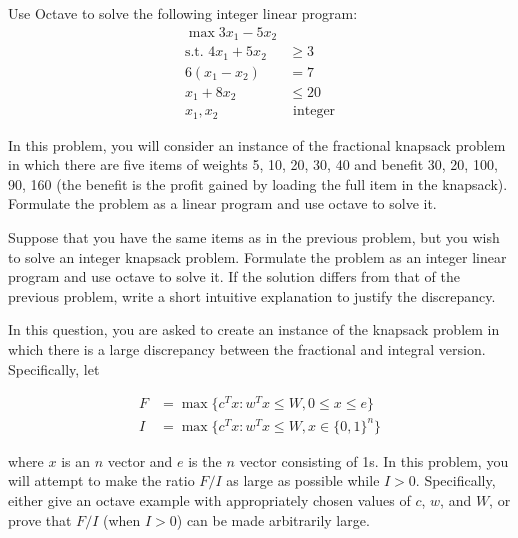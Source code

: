 \documentclass[fleqn]{homework}
\begin{document}
  \begin{problem}{3}
    \begin{question}
      Use Octave to solve the following integer linear program:
      \begin{align*}
        \max 3x_1 - 5x_2 & \\
        \text{s.t.  } 4x_1 + 5x_2 &\ge 3 \\
        6(x_1 - x_2) &= 7 \\
        x_1 + 8x_2 &\le 20 \\
        x_1, x_2 &\text{ integer}
      \end{align*}
    \end{question}
  \end{problem}

  \begin{problem}{4}
    \begin{question}
      In this problem, you will consider an instance of the fractional knapsack
      problem in which there are five items of weights 5, 10, 20, 30, 40 and
      benefit 30, 20, 100, 90, 160 (the benefit is the profit gained by loading
      the full item in the knapsack).  Formulate the problem as a linear program
      and use octave to solve it.
    \end{question}
  \end{problem}

  \begin{problem}{5}
    \begin{question}
      Suppose that you have the same items as in the previous problem, but you
      wish to solve an integer knapsack problem.  Formulate the problem as an
      integer linear program and use octave to solve it.  If the solution
      differs from that of the previous problem, write a short intuitive
      explanation to justify the discrepancy.
    \end{question}
  \end{problem}

  \begin{problem}{6}
    \begin{question}
      In this question, you are asked to create an instance of the knapsack
      problem in which there is a large discrepancy between the fractional and
      integral version.  Specifically, let

      \begin{align*}
        F &= \max \{c^T x: w^T x \leq W, 0 \leq x \leq e\}\\
        I &= \max \{c^T x: w^T x \leq W, x\in\{0,1\}^n\}
      \end{align*}

      where $x$ is an $n$ vector and $e$ is the $n$ vector consisting of 1s.  In
      this problem, you will attempt to make the ratio $F/I$ as large as
      possible while $I>0$.  Specifically, either give an octave example with
      appropriately chosen values of $c$, $w$, and $W$, or prove that $F/I$
      (when $I>0$) can be made arbitrarily large.
    \end{question}
  \end{problem}
\end{document}
